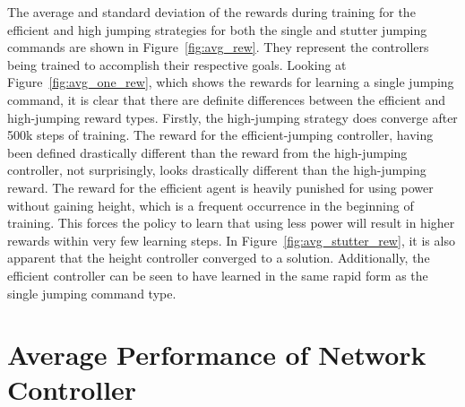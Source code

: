The average and standard deviation of the rewards during training for the efficient and high jumping strategies for both the single and stutter jumping commands are shown in Figure~\ref{fig:avg_rew}. They represent the controllers being trained to accomplish their respective goals. Looking at Figure~\ref{fig:avg_one_rew}, which shows the rewards for learning a single jumping command, it is clear that there are definite differences between the efficient and high-jumping reward types. Firstly, the high-jumping strategy does converge after 500k steps of training. The reward for the efficient-jumping controller, having been defined drastically different than the reward from the high-jumping controller, not surprisingly, looks drastically different than the high-jumping reward. The reward for the efficient agent is heavily punished for using power without gaining height, which is a frequent occurrence in the beginning of training. This forces the policy to learn that using less power will result in higher rewards within very few learning steps. In Figure~\ref{fig:avg_stutter_rew}, it is also apparent that the height controller converged to a solution. Additionally, the efficient controller can be seen to have learned in the same rapid form as the single jumping command type. 


\section{Average Performance of Network Controller}
\label{section:avg_performance}
% 
